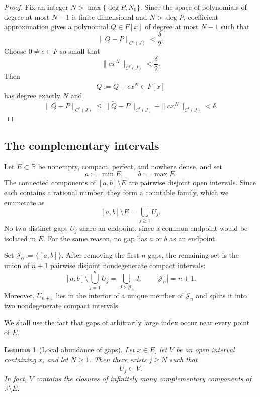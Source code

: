 \documentclass[11pt,reqno]{amsart}
\numberwithin{equation}{section}
\newtheorem{lemma}[theorem]{Lemma}
\theoremstyle{definition}
\theoremstyle{remark}
\newcommand{\R}{\mathbb R}
\begin{document}
\begin{proof}
Fix an integer $N>\max\{\deg P,N_0\}$. Since the space of polynomials of degree at most $N-1$ is
finite-dimensional and $N>\deg P$, coefficient approximation gives
a polynomial $\widetilde Q\in F[x]$ of degree at most $N-1$ such that
\[
\|\widetilde Q-P\|_{C^r(J)}<\frac{\delta}{2}.
\]
Choose $0\neq c\in F$ so small that
\[
\|cx^N\|_{C^r(J)}<\frac{\delta}{2}.
\]
Then
\[
Q:=\widetilde Q+cx^N\in F[x]
\]
has degree exactly $N$ and
\[
\|Q-P\|_{C^r(J)}
\leq
\|\widetilde Q-P\|_{C^r(J)}
+\|cx^N\|_{C^r(J)}
<\delta.
\]
\end{proof}

\subsection*{The complementary intervals}

Let $E\subset\R$ be nonempty, compact, perfect, and nowhere dense, and set
\[
a:=\min E,
\qquad
b:=\max E.
\]
The connected components of $[a,b]\setminus E$ are pairwise disjoint open
intervals. Since each contains a rational number, they form a countable
family, which we enumerate as
\[
[a,b]\setminus E=\bigcup_{j\geq1}U_j.
\]
No two distinct gaps $U_j$ share an endpoint, since a common endpoint would
be isolated in $E$. For the same reason, no gap has $a$ or $b$ as an
endpoint.

Set $\mathcal J_0:=\{[a,b]\}$. After removing the first $n$ gaps, the
remaining set is the union of $n+1$ pairwise disjoint nondegenerate compact
intervals:
\begin{equation}\label{eq:Jn}
[a,b]\setminus\bigcup_{j=1}^n U_j
=\bigcup_{J\in\mathcal J_n}J,
\qquad
|\mathcal J_n|=n+1.
\end{equation}
Moreover, $U_{n+1}$ lies in the interior of a unique member of
$\mathcal J_n$ and splits it into two nondegenerate compact intervals.

We shall use the fact that gaps of arbitrarily large index occur near every
point of $E$.

\begin{lemma}[Local abundance of gaps]\label{lem:gaps}
Let $x\in E$, let $V$ be an open interval containing $x$, and let $N\geq1$.
Then there exists $j\geq N$ such that
\[
\overline{U_j}\subset V.
\]
In fact, $V$ contains the closures of infinitely many complementary
components of $\R\setminus E$.
\end{lemma}
\end{document}
